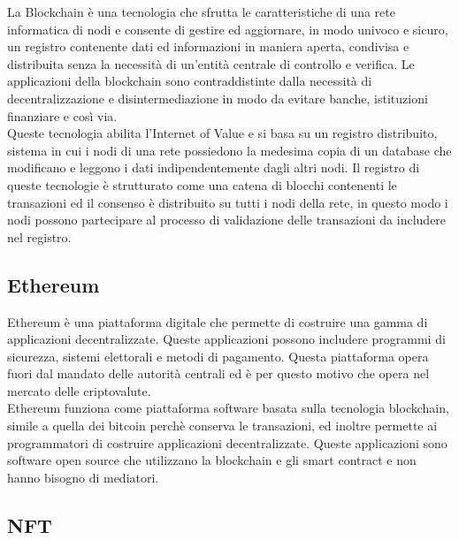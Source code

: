 La Blockchain è una tecnologia che sfrutta le caratteristiche di una rete informatica di nodi e consente di gestire ed aggiornare, in modo univoco e sicuro, un registro contenente dati ed informazioni in maniera aperta, condivisa e distribuita senza la necessità di un'entità centrale di controllo e verifica. Le applicazioni della blockchain sono contraddistinte dalla necessità di decentralizzazione e disintermediazione in modo da evitare banche, istituzioni finanziare e così via.\\
Queste tecnologia abilita l'Internet of Value e si basa su un registro distribuito, sistema in cui i nodi di una rete possiedono la medesima copia di un database che modificano e leggono i dati indipendentemente dagli altri nodi. Il registro di queste tecnologie è strutturato come una catena di blocchi contenenti le transazioni ed il consenso è distribuito su tutti i nodi della rete, in questo modo i nodi possono partecipare al processo di validazione delle transazioni da includere nel registro.

\subsection{Ethereum}
\label{subsec:ethereum}

Ethereum è una piattaforma digitale che permette di costruire una gamma di applicazioni decentralizzate. Queste applicazioni possono includere programmi di sicurezza, sistemi elettorali e metodi di pagamento. Questa piattaforma opera fuori dal mandato delle autorità centrali ed è per questo motivo che opera nel mercato delle criptovalute.\\
Ethereum funziona come piattaforma software basata sulla tecnologia blockchain, simile a quella dei bitcoin perchè conserva le transazioni, ed inoltre permette ai programmatori di costruire applicazioni decentralizzate. Queste applicazioni sono software open source che utilizzano la blockchain e gli smart contract e non hanno bisogno di mediatori. 

\subsection{NFT}
\label{subsec:nft}

